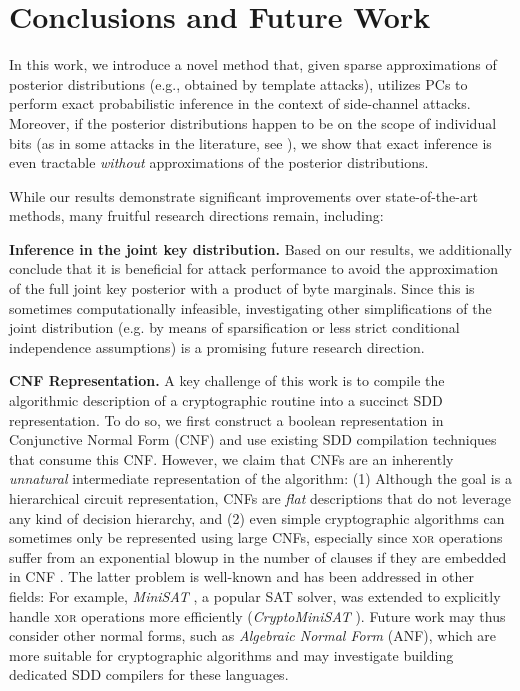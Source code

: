 \chapter{Conclusions and Future Work}
\label{cha:conclusions}

In this work, we introduce a novel method that, given sparse approximations of posterior distributions (e.g., obtained by template attacks), utilizes PCs to perform exact probabilistic inference in the context of side-channel attacks.
Moreover, if the posterior distributions happen to be on the scope of individual bits (as in some attacks in the literature, see \cite{bit_posterior1, bit_posterior2}), we show that exact inference is even tractable \emph{without} approximations of the posterior distributions. 


While our results demonstrate significant improvements over state-of-the-art methods, many fruitful research directions remain, including: 

\textbf{Inference in the joint key distribution.} Based on our results, we additionally conclude that it is beneficial for attack performance to avoid the approximation of the full joint key posterior with a product of byte marginals. Since this is sometimes computationally infeasible, investigating other simplifications of the joint distribution (e.g. by means of sparsification or less strict conditional independence assumptions) is a promising future research direction.  

\textbf{CNF Representation.} 
A key challenge of this work is to compile the algorithmic description of a cryptographic routine into a succinct SDD representation. To do so, we first construct a boolean representation in Conjunctive Normal Form (CNF) and use existing SDD compilation techniques that consume this CNF. However, we claim that CNFs are an inherently \emph{unnatural} intermediate representation of the algorithm: (1) Although the goal is a hierarchical circuit representation, CNFs are \emph{flat} descriptions that do not leverage any kind of decision hierarchy, and (2) even simple cryptographic algorithms can sometimes only be represented using large CNFs, especially since \textsc{xor} operations suffer from an exponential blowup in the number of clauses if they are embedded in CNF \cite{asca}. The latter problem is well-known and has been addressed in other fields: For example, \emph{MiniSAT} \cite{minisat}, a popular SAT solver, was extended to explicitly handle \textsc{xor} operations more efficiently (\emph{CryptoMiniSAT} \cite{cryptominisat}). 
Future work may thus consider other normal forms, such as \emph{Algebraic Normal Form} (ANF), which are more suitable for cryptographic algorithms and may investigate building dedicated SDD compilers for these languages.

